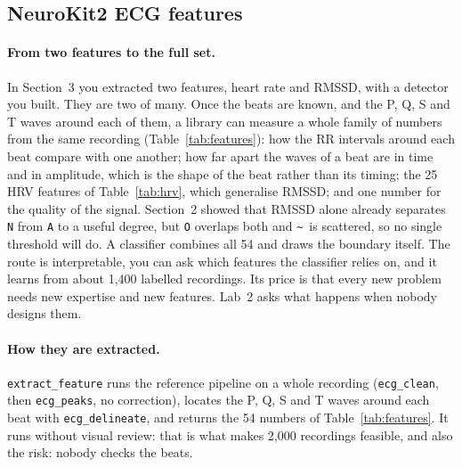 \documentclass[12pt,article,oneside,linkcolour=blue]{oxengthesis}
\newcommand{\noise}{\texttt{\textasciitilde}}
\newcommand{\nb}[1]{\noindent{\small\textsf{Notebook: #1}}\par\nopagebreak\smallskip}
\begin{document}
\subsection{NeuroKit2 ECG features}
\nb{4.1}
\paragraph{From two features to the full set.} In Section~3 you extracted two features,
heart rate and RMSSD, with a detector you built. They are two of many. Once the beats are
known, and the P, Q, S and T waves around each of them, a library can measure a whole family of
numbers from the same recording (Table~\ref{tab:features}): how the RR intervals around each
beat compare with one another; how far apart the waves of a beat are in time and in amplitude,
which is the shape of the beat rather than its timing; the 25 HRV features of
Table~\ref{tab:hrv}, which generalise RMSSD; and one number for the quality of the signal.
Section~2 showed that RMSSD alone already separates \texttt{N} from \texttt{A} to a useful
degree, but \texttt{O} overlaps both and \noise\ is scattered, so no single threshold will do.
A classifier combines all 54 and draws the boundary itself. The route is interpretable, you can
ask which features the classifier relies on, and it learns from about 1,400 labelled
recordings. Its price is that every new problem needs new expertise and new features. Lab~2
asks what happens when nobody designs them.

\paragraph{How they are extracted.} \texttt{extract\_feature} runs the reference pipeline on a
whole recording (\texttt{ecg\_clean}, then \texttt{ecg\_peaks}, no correction), locates the P,
Q, S and T waves around each beat with \texttt{ecg\_delineate}, and returns the 54 numbers of
Table~\ref{tab:features}. It runs without visual review: that is what makes 2,000 recordings
feasible, and also the risk: nobody checks the beats.
\end{document}
